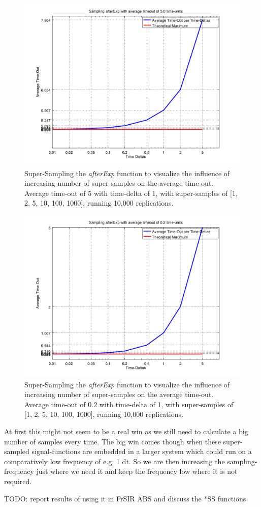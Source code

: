 \begin{figure}
	\centering
	\includegraphics[width=.6\textwidth, angle=0]{./../shared/fig/samplingTest_afterExp_5time.png}
	\caption{Super-Sampling the \textit{afterExp} function to visualize the influence of increasing number of super-samples on the average time-out. Average time-out of 5 with time-delta of 1, with super-samples of [1, 2, 5, 10, 100, 1000], running 10,000 replications.}
	\label{fig:sampling_afterExp_ss_5time}
\end{figure}

\begin{figure}
	\centering
	\includegraphics[width=.6\textwidth, angle=0]{./../shared/fig/samplingTest_afterExp_02time.png}
	\caption{Super-Sampling the \textit{afterExp} function to visualize the influence of increasing number of super-samples on the average time-out. Average time-out of 0.2 with time-delta of 1, with super-samples of [1, 2, 5, 10, 100, 1000], running 10,000 replications.}
	\label{fig:sampling_afterExp_ss_02time}
\end{figure}

At first this might not seem to be a real win as we still need to calculate a big number of samples every time. The big win comes though when these super-sampled signal-functions are embedded in a larger system which could run on a comparatively low frequency of e.g. 1 dt. So we are then increasing the sampling-frequency just where we need it and keep the frequency low where it is not required.

TODO: report results of using it in FrSIR ABS and discuss the *SS functions 
